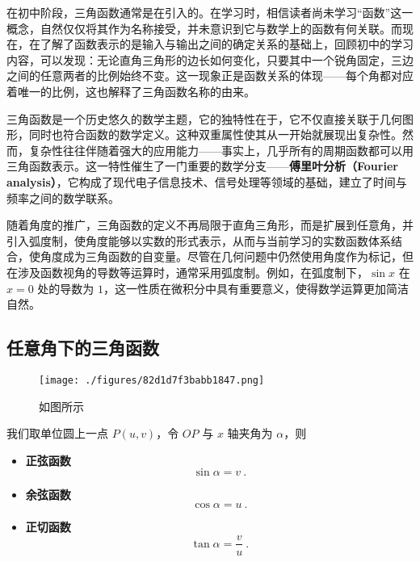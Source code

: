 \begin{issues}
\issueDraft
\end{issues}

在初中阶段，三角函数通常是在引入的。在学习时，相信读者尚未学习“函数”这一概念，自然仅仅将其作为名称接受，并未意识到它与数学上的函数有何关联。而现在，在了解了函数表示的是输入与输出之间的确定关系的基础上，回顾初中的学习内容，可以发现：无论直角三角形的边长如何变化，只要其中一个锐角固定，三边之间的任意两者的比例始终不变。这一现象正是函数关系的体现——每个角都对应着唯一的比例，这也解释了三角函数名称的由来。

三角函数是一个历史悠久的数学主题，它的独特性在于，它不仅直接关联于几何图形，同时也符合函数的数学定义。这种双重属性使其从一开始就展现出复杂性。然而，复杂性往往伴随着强大的应用能力——事实上，几乎所有的周期函数都可以用三角函数表示。这一特性催生了一门重要的数学分支——\textbf{傅里叶分析（Fourier analysis）}，它构成了现代电子信息技术、信号处理等领域的基础，建立了时间与频率之间的数学联系。

随着角度的推广，三角函数的定义不再局限于直角三角形，而是扩展到任意角，并引入弧度制，使角度能够以实数的形式表示，从而与当前学习的实数函数体系结合，使角度成为三角函数的自变量。尽管在几何问题中仍然使用角度作为标记，但在涉及函数视角的导数等运算时，通常采用弧度制。例如，在弧度制下，$\sin x$ 在 $x=0$ 处的导数为 $1$，这一性质在微积分中具有重要意义，使得数学运算更加简洁自然。

\subsection{任意角下的三角函数}

\begin{figure}[ht]
\centering
\texttt{[image: ./figures/82d1d7f3babb1847.png]}
\caption{如图所示} \label{fig_HsTrFu_3}
\end{figure}

我们取单位圆上一点 $P(u,v)$，令 $OP$ 与 $x$ 轴夹角为 $\alpha$，则

\begin{definition}{}
\begin{itemize}
\item \textbf{正弦函数}
\begin{equation}
\displaystyle\sin \alpha = v~.
\end{equation}
\item \textbf{余弦函数}
\begin{equation}
\displaystyle\cos \alpha = u~.
\end{equation}
\item \textbf{正切函数}
\begin{equation}
\displaystyle\tan \alpha = \frac{v}{u}~.
\end{equation}
\end{itemize}
\end{definition}

